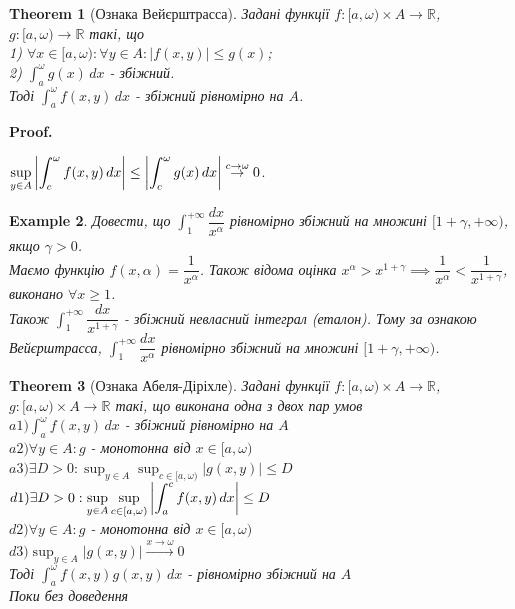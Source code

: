 \documentclass[a4paper, 10pt]{article}
\makeatletter
\def\huge{\displaystyle}
\def\bigline{\vspace{5mm}\\}
\def\qed{$\blacksquare$}
\theoremstyle{theoremdd}
\newtheorem{theorem}{Theorem}[subsection]
\theoremstyle{theoremdd}
\theoremstyle{theoremdd}
\theoremstyle{theoremdd}
\newtheorem{example}[theorem]{Example}
\theoremstyle{theoremdd}
\theoremstyle{theoremdd}
\theoremstyle{theoremdd}
\theoremstyle{theoremdd}
\renewenvironment{proof}[1][Proof.\\]{\par
\pushQED{\hfill \qed}%
\normalfont \topsep6\p@\@plus6\p@\relax
\trivlist
\item\relax
{\bfseries
#1\@addpunct{.}}\hspace\labelsep\ignorespaces
}{%
\popQED\endtrivlist\@endpefalse
}
\makeatother
\begin{document}
\begin{theorem}[Ознака Вейєрштрасса]
Задані функції $f: [a,\omega) \times A \to \mathbb{R}$, $g: [a,\omega) \to \mathbb{R}$ такі, що\\
1) $\forall x \in [a,\omega): \forall y \in A: |f(x,y)| \leq g(x)$;\\
2) $\huge \int_a^\omega g(x)\,dx$ - збіжний.\\
Тоді $\huge \int_a^\omega f(x,y)\,dx$ - збіжний рівномірно на $A$.
\end{theorem}

\begin{proof}
$\huge \sup_{y \in A} \abs{\int_c^\omega f(x,y)\,dx} \leq \abs{\int_c^\omega g(x)\,dx} \overset{c \to \omega}{\to} 0$.
\end{proof}

\begin{example}
Довести, що $\huge\int_1^{+\infty} \dfrac{dx}{x^\alpha}$ рівномірно збіжний на множині $[1+\gamma,+\infty)$, якщо $\gamma > 0$.\\
Маємо функцію $f(x,\alpha) = \dfrac{1}{x^\alpha}$. Також відома оцінка $x^\alpha > x^{1+\gamma} \implies \dfrac{1}{x^\alpha} < \dfrac{1}{x^{1+\gamma}}$, виконано $\forall x \geq 1$.\\
Також $\huge\int_1^{+\infty} \dfrac{dx}{x^{1+\gamma}}$ - збіжний невласний інтеграл (еталон). Тому за ознакою Вейєрштрасса, $\huge\int_1^{+\infty} \dfrac{dx}{x^\alpha}$ рівномірно збіжний на множині $[1+\gamma,+\infty)$.
\end{example}

\begin{theorem}[Ознака Абеля-Діріхле]
Задані функції $f: [a,\omega) \times A \to \mathbb{R}$, $g: [a,\omega) \times A \to \mathbb{R}$ такі, що виконана одна з двох пар умов\\
$a1) \huge \int_a^\omega f(x,y)\,dx$ - збіжний рівномірно на $A$\\
$a2) \forall y \in A: g$ - монотонна від $x \in [a,\omega)$\\
$a3) \exists D>0: \huge \sup_{y \in A} \sup_{c \in [a,\omega)} |g(x,y)| \leq D$
\bigline
$d1) \exists D>0: \huge \sup_{y \in A} \sup_{c \in [a,\omega)} \abs{\int_a^c f(x,y)\,dx} \leq D$\\
$d2) \forall y \in A: g$ - монотонна від $x \in [a,\omega)$\\
$d3) \huge \sup_{y \in A} |g(x,y)| \overset{x \to \omega}{\to} 0$\\
Тоді $\huge \int_a^\omega f(x,y) g(x,y)\,dx$ - рівномірно збіжний на $A$\\
\textit{Поки без доведення}
\end{theorem}
\end{document}
